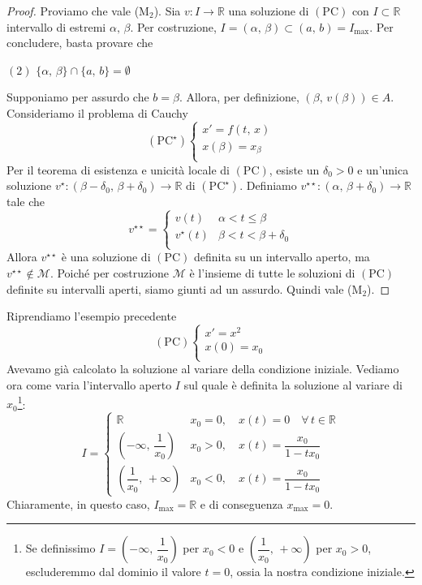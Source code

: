 \begin{proof}
Proviamo che vale \textnormal{(M$_2$)}. Sia $v : I \longrightarrow \mathbb{R}$ una soluzione di $\mathrm{(PC)}$ con $I \subset \mathbb{R}$ intervallo di estremi $\alpha,\,\beta$. Per costruzione, $I = (\alpha,\,\beta) \subset (a,\,b) = I_{\max}$. Per concludere, basta provare che
\begin{center}
$\mathrm{(2)}$
\hfill
$\displaystyle
\lbrace \alpha,\,\beta \rbrace \cap \lbrace a,\,b \rbrace = \emptyset
$
\hfill \null \\
\end{center}
Supponiamo per assurdo che $b = \beta$. Allora, per definizione, $(\beta,\,v(\beta)) \in A$. Consideriamo il problema di Cauchy
$$
\mathrm{(PC^{\star})}
\begin{cases}
x' = f(t,\,x)\\
x(\beta) = x_{\beta}\\
\end{cases}
$$
Per il teorema di esistenza e unicità locale di $\mathrm{(PC)}$, esiste un $\delta_0 > 0$ e un'unica soluzione $v^{\star} : (\beta-\delta_0,\,\beta+\delta_0) \longrightarrow \mathbb{R}$ di $\mathrm{(PC^{\star})}$. Definiamo $v^{\star\star} : (\alpha,\,\beta+\delta_0) \longrightarrow \mathbb{R}$ tale che
$$
v^{\star\star} =
\begin{cases}
v(t) & \alpha < t \leq \beta\\
v^{\star}(t) & \beta < t < \beta+\delta_0\\
\end{cases}
$$
Allora $v^{\star\star}$ è una soluzione di $\mathrm{(PC)}$ definita su un intervallo aperto, ma $v^{\star\star} \notin \mathscr{M}$. Poiché per costruzione $\mathscr{M}$ è l'insieme di tutte le soluzioni di $\mathrm{(PC)}$ definite su intervalli aperti, siamo giunti ad un assurdo. Quindi vale \textnormal{(M$_2$)}.
\end{proof}

\begin{example}
Riprendiamo l'esempio precedente
$$
\mathrm{(PC)}
\begin{cases}
x' = x^2\\
x(0) = x_0\\
\end{cases}
$$
Avevamo già calcolato la soluzione al variare della condizione iniziale. Vediamo ora come varia l'intervallo aperto $I$ sul quale è definita la soluzione al variare di $x_0$\footnote{
Se definissimo $I = \left( -\infty,\,\dfrac{1}{x_0} \right)$ per $x_0 < 0$ e $\left( \dfrac{1}{x_0},\,+\infty \right)$ per $x_0 > 0$, escluderemmo dal dominio il valore $t=0$, ossia la nostra condizione iniziale.
}:
$$
I =
\begin{cases}
\mathbb{R} & x_0 = 0, \quad x(t) = 0 \quad \forall \, t \in \mathbb{R}\\
\left( -\infty,\,\dfrac{1}{x_0} \right) & x_0 > 0, \quad x(t) = \dfrac{x_0}{1-tx_0}\\
\left( \dfrac{1}{x_0},\,+\infty \right) & x_0 < 0, \quad x(t) = \dfrac{x_0}{1-tx_0}
\end{cases}
$$
Chiaramente, in questo caso, $I_{\max} = \mathbb{R}$ e di conseguenza $x_{\max} = 0$.
\end{example}



